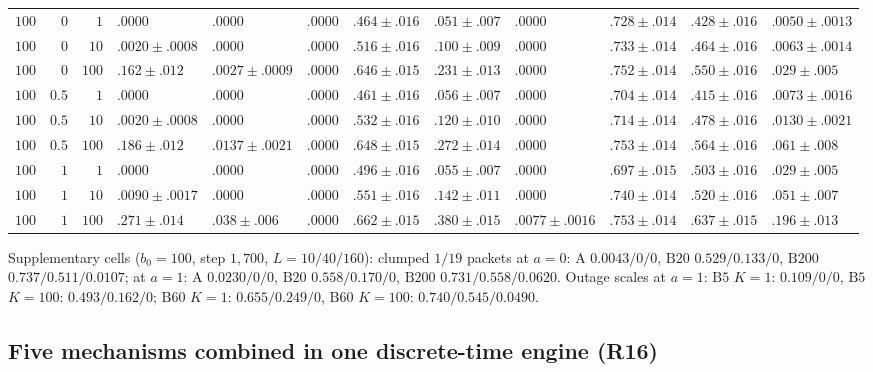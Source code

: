 \begin{table}[htbp]
\begin{tabular}{rrr|lll|lll|lll}
$100$ & $0$ & $1$ & $.0000$ & $.0000$ & $.0000$ & $.464 \pm .016$ & $.051 \pm .007$ & $.0000$ & $.728 \pm .014$ & $.428 \pm .016$ & $.0050 \pm .0013$\\
$100$ & $0$ & $10$ & $.0020 \pm .0008$ & $.0000$ & $.0000$ & $.516 \pm .016$ & $.100 \pm .009$ & $.0000$ & $.733 \pm .014$ & $.464 \pm .016$ & $.0063 \pm .0014$\\
$100$ & $0$ & $100$ & $.162 \pm .012$ & $.0027 \pm .0009$ & $.0000$ & $.646 \pm .015$ & $.231 \pm .013$ & $.0000$ & $.752 \pm .014$ & $.550 \pm .016$ & $.029 \pm .005$\\
$100$ & $0.5$ & $1$ & $.0000$ & $.0000$ & $.0000$ & $.461 \pm .016$ & $.056 \pm .007$ & $.0000$ & $.704 \pm .014$ & $.415 \pm .016$ & $.0073 \pm .0016$\\
$100$ & $0.5$ & $10$ & $.0020 \pm .0008$ & $.0000$ & $.0000$ & $.532 \pm .016$ & $.120 \pm .010$ & $.0000$ & $.714 \pm .014$ & $.478 \pm .016$ & $.0130 \pm .0021$\\
$100$ & $0.5$ & $100$ & $.186 \pm .012$ & $.0137 \pm .0021$ & $.0000$ & $.648 \pm .015$ & $.272 \pm .014$ & $.0000$ & $.753 \pm .014$ & $.564 \pm .016$ & $.061 \pm .008$\\
$100$ & $1$ & $1$ & $.0000$ & $.0000$ & $.0000$ & $.496 \pm .016$ & $.055 \pm .007$ & $.0000$ & $.697 \pm .015$ & $.503 \pm .016$ & $.029 \pm .005$\\
$100$ & $1$ & $10$ & $.0090 \pm .0017$ & $.0000$ & $.0000$ & $.551 \pm .016$ & $.142 \pm .011$ & $.0000$ & $.740 \pm .014$ & $.520 \pm .016$ & $.051 \pm .007$\\
$100$ & $1$ & $100$ & $.271 \pm .014$ & $.038 \pm .006$ & $.0000$ & $.662 \pm .015$ & $.380 \pm .015$ & $.0077 \pm .0016$ & $.753 \pm .014$ & $.637 \pm .015$ & $.196 \pm .013$\\\bottomrule
\end{tabular}
\par\smallskip\raggedright\footnotesize
Supplementary cells ($b_0 = 100$, step $1{,}700$, $L = 10 / 40 / 160$): clumped $1/19$ packets at $a=0$: $\mathrm{A}$ $0.0043 / 0 / 0$, $\mathrm{B20}$ $0.529 / 0.133 / 0$, $\mathrm{B200}$ $0.737 / 0.511 / 0.0107$; at $a=1$: $\mathrm{A}$ $0.0230 / 0 / 0$, $\mathrm{B20}$ $0.558 / 0.170 / 0$, $\mathrm{B200}$ $0.731 / 0.558 / 0.0620$. Outage scales at $a=1$: $\mathrm{B5}$ $K=1$: $0.109 / 0 / 0$, $\mathrm{B5}$ $K=100$: $0.493 / 0.162 / 0$; $\mathrm{B60}$ $K=1$: $0.655 / 0.249 / 0$, $\mathrm{B60}$ $K=100$: $0.740 / 0.545 / 0.0490$.
\end{table}

\subsection{Five mechanisms combined in one discrete-time engine (R16)}\label{num-esm-r16}

